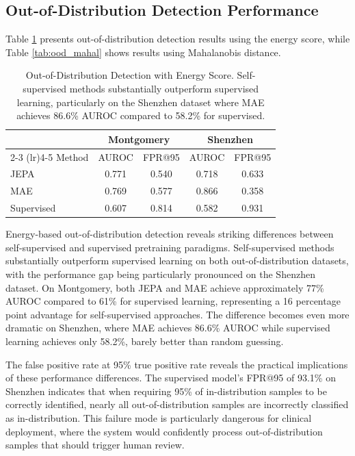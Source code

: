 \documentclass[11pt,a4paper]{article}
\begin{document}
\subsection{Out-of-Distribution Detection Performance}

Table \ref{tab:ood_energy} presents out-of-distribution detection results using the energy score, while Table \ref{tab:ood_mahal} shows results using Mahalanobis distance.

\begin{table}[h]
\centering
\caption{Out-of-Distribution Detection with Energy Score. Self-supervised methods substantially outperform supervised learning, particularly on the Shenzhen dataset where MAE achieves 86.6\% AUROC compared to 58.2\% for supervised.}
\label{tab:ood_energy}
\begin{tabular}{@{}lcccc@{}}
\toprule
& \multicolumn{2}{c}{Montgomery} & \multicolumn{2}{c}{Shenzhen} \\
\cmidrule(lr){2-3} \cmidrule(lr){4-5}
Method & AUROC & FPR@95 & AUROC & FPR@95 \\
\midrule
JEPA & 0.771 & 0.540 & 0.718 & 0.633 \\
MAE & 0.769 & 0.577 & 0.866 & 0.358 \\
Supervised & 0.607 & 0.814 & 0.582 & 0.931 \\
\bottomrule
\end{tabular}
\end{table}

Energy-based out-of-distribution detection reveals striking differences between self-supervised and supervised pretraining paradigms. Self-supervised methods substantially outperform supervised learning on both out-of-distribution datasets, with the performance gap being particularly pronounced on the Shenzhen dataset. On Montgomery, both JEPA and MAE achieve approximately 77\% AUROC compared to 61\% for supervised learning, representing a 16 percentage point advantage for self-supervised approaches. The difference becomes even more dramatic on Shenzhen, where MAE achieves 86.6\% AUROC while supervised learning achieves only 58.2\%, barely better than random guessing.

The false positive rate at 95\% true positive rate reveals the practical implications of these performance differences. The supervised model's FPR@95 of 93.1\% on Shenzhen indicates that when requiring 95\% of in-distribution samples to be correctly identified, nearly all out-of-distribution samples are incorrectly classified as in-distribution. This failure mode is particularly dangerous for clinical deployment, where the system would confidently process out-of-distribution samples that should trigger human review.
\end{document}
